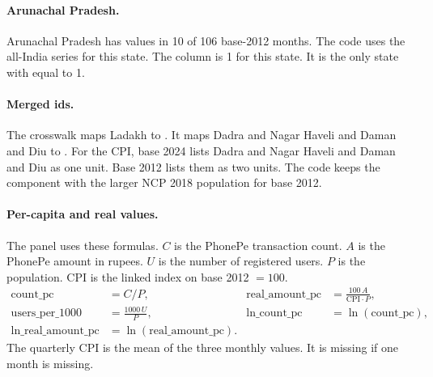\documentclass[11pt,a4paper]{article}
\begin{document}
\paragraph{Arunachal Pradesh.}
Arunachal Pradesh has values in 10 of 106 base-2012 months. The code uses the all-India series for this state. The column  is 1 for this state.
It is the only state with  equal to 1.

\paragraph{Merged ids.}
The crosswalk maps Ladakh to . It maps Dadra and Nagar Haveli and Daman and Diu to .
For the CPI, base 2024 lists Dadra and Nagar Haveli and Daman and Diu as one unit. Base 2012 lists them as two units. The code keeps the component with the larger NCP 2018 population for base 2012.

\paragraph{Per-capita and real values.}
The panel uses these formulas. $C$ is the PhonePe transaction count. $A$ is the PhonePe amount in rupees. $U$ is the number of registered users. $P$ is the population. $\mathrm{CPI}$ is the linked index on base 2012 $=100$.
\begin{align*}
\mathrm{count\_pc} &= C / P, &
\mathrm{real\_amount\_pc} &= \frac{100\,A}{\mathrm{CPI}\cdot P}, \\
\mathrm{users\_per\_1000} &= \frac{1000\,U}{P}, &
\mathrm{ln\_count\_pc} &= \ln(\mathrm{count\_pc}), \\
\mathrm{ln\_real\_amount\_pc} &= \ln(\mathrm{real\_amount\_pc}). & &
\end{align*}
The quarterly CPI is the mean of the three monthly values. It is missing if one month is missing.
\end{document}

